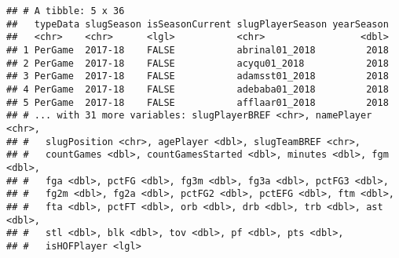 \documentclass[]{article}
\newenvironment{Shaded}{\begin{snugshade}}{\end{snugshade}}
\newcommand{\KeywordTok}[1]{\textcolor[rgb]{0.13,0.29,0.53}{\textbf{#1}}}
\newcommand{\DecValTok}[1]{\textcolor[rgb]{0.00,0.00,0.81}{#1}}
\newcommand{\StringTok}[1]{\textcolor[rgb]{0.31,0.60,0.02}{#1}}
\newcommand{\OperatorTok}[1]{\textcolor[rgb]{0.81,0.36,0.00}{\textbf{#1}}}
\newcommand{\NormalTok}[1]{#1}
\begin{document}
\begin{Shaded}
\end{Shaded}

\begin{verbatim}
## # A tibble: 5 x 36
##   typeData slugSeason isSeasonCurrent slugPlayerSeason yearSeason
##   <chr>    <chr>      <lgl>           <chr>                 <dbl>
## 1 PerGame  2017-18    FALSE           abrinal01_2018         2018
## 2 PerGame  2017-18    FALSE           acyqu01_2018           2018
## 3 PerGame  2017-18    FALSE           adamsst01_2018         2018
## 4 PerGame  2017-18    FALSE           adebaba01_2018         2018
## 5 PerGame  2017-18    FALSE           afflaar01_2018         2018
## # ... with 31 more variables: slugPlayerBREF <chr>, namePlayer <chr>,
## #   slugPosition <chr>, agePlayer <dbl>, slugTeamBREF <chr>,
## #   countGames <dbl>, countGamesStarted <dbl>, minutes <dbl>, fgm <dbl>,
## #   fga <dbl>, pctFG <dbl>, fg3m <dbl>, fg3a <dbl>, pctFG3 <dbl>,
## #   fg2m <dbl>, fg2a <dbl>, pctFG2 <dbl>, pctEFG <dbl>, ftm <dbl>,
## #   fta <dbl>, pctFT <dbl>, orb <dbl>, drb <dbl>, trb <dbl>, ast <dbl>,
## #   stl <dbl>, blk <dbl>, tov <dbl>, pf <dbl>, pts <dbl>,
## #   isHOFPlayer <lgl>
\end{verbatim}
\end{document}
